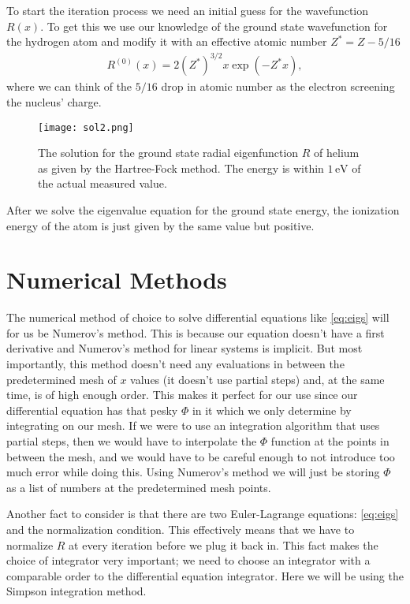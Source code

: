 \documentclass[10pt,a4paper,twocolumn]{article}
\begin{document}
To start the iteration process we need an initial guess for the wavefunction $R(x)$. To get this we use our knowledge of the ground state wavefunction for the hydrogen atom and modify it with an effective atomic number $Z^* = Z - 5/16$
%
\begin{align}\label{eq:initial}
    R^{(0)}(x) = 2 \left( Z^* \right)^{3/2} x \exp(- Z^* x),
\end{align}
%
where we can think of the $5/16$ drop in atomic number as the electron screening the nucleus' charge.

\begin{figure}[!b]
    \centering
    \texttt{[image: sol2.png]}
    \caption{The solution for the ground state radial eigenfunction $R$ of helium as given by the Hartree-Fock method. The energy is within $1\,\mathrm{eV}$ of the actual measured value.}
    \label{fig:sol2}
\end{figure}

After we solve the eigenvalue equation for the ground state energy, the ionization energy of the atom is just given by the same value but positive.

\section{Numerical Methods}

The numerical method of choice to solve differential equations like \cref{eq:eigs} will for us be Numerov's method. This is because our equation doesn't have a first derivative and Numerov's method for linear systems is implicit. But most importantly, this method doesn't need any evaluations in between the predetermined mesh of $x$ values (it doesn't use partial steps) and, at the same time, is of high enough order. This makes it perfect for our use since our differential equation has that pesky $\Phi$ in it which we only determine by integrating on our mesh. If we were to use an integration algorithm that uses partial steps, then we would have to interpolate the $\Phi$ function at the points in between the mesh, and we would have to be careful enough to not introduce too much error while doing this. Using Numerov's method we will just be storing $\Phi$ as a list of numbers at the predetermined mesh points.

Another fact to consider is that there are two Euler-Lagrange equations: \cref{eq:eigs} and the normalization condition. This effectively means that we have to normalize $R$ at every iteration before we plug it back in. This fact makes the choice of integrator very important; we need to choose an integrator with a comparable order to the differential equation integrator. Here we will be using the Simpson integration method.
\end{document}
